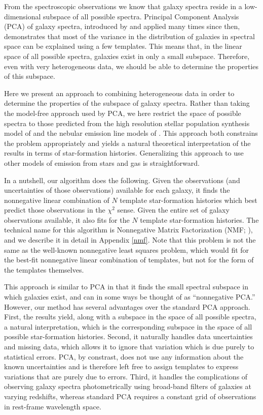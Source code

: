\documentclass[12pt,preprint]{aastex}
\begin{document}
From the spectroscopic observations we know that galaxy spectra reside
in a low-dimensional subspace of all possible spectra. Principal
Component Analysis (PCA) of galaxy spectra, introduced by
\citet{connolly95b} and applied many times since then, demonstrates
that most of the variance in the distribution of galaxies in spectral
space can be explained using a few templates. This means that, in the
linear space of all possible spectra, galaxies exist in only a small
subspace. Therefore, even with very heterogeneous data, we should be
able to determine the properties of this subspace.

Here we present an approach to combining heterogeneous data in order
to determine the properties of the subspace of galaxy spectra. Rather
than taking the model-free approach used by PCA, we here restrict the
space of possible spectra to those predicted from the high resolution
stellar population synthesis model of \citet{bruzual03a} and the
nebular emission line models of \citet{kewley01a}.  This approach both
constrains the problem appropriately and yields a natural theoretical
interpretation of the results in terms of star-formation
histories. Generalizing this approach to use other models of emission
from stars and gas is straightforward.

In a nutshell, our algorithm does the following. Given the
observations (and uncertainties of those observations) available for
each galaxy, it finds the nonnegative linear combination of $N$
template star-formation histories which best predict those
observations in the $\chi^2$ sense. Given the entire set of galaxy
observations available, it also fits for the $N$ template
star-formation histories. The technical name for this algorithm is
Nonnegative Matrix Factorization (NMF; \citealt{lee99a, lee00a}), and
we describe it in detail in Appendix \ref{nmf}. Note that this problem
is not the same as the well-known nonnegative least squares problem,
which would fit for the best-fit nonnegative linear combination of
templates, but not for the form of the templates themselves.

This approach is similar to PCA in that it finds the small spectral
subspace in which galaxies exist, and can in some ways be thought of
as ``nonnegative PCA.''  However, our method has several advantages
over the standard PCA approach. First, the results yield, along with a
subspace in the space of all possible spectra, a natural
interpretation, which is the corresponding subspace in the space of
all possible star-formation histories. Second, it naturally handles
data uncertainties and missing data, which allows it to ignore that
variation which is due purely to statistical errors. PCA, by
constrast, does not use any information about the known uncertainties
and is therefore left free to assign templates to express variations
that are purely due to errors. Third, it handles the complications of
observing galaxy spectra photometrically using broad-band filters of
galaxies at varying redshifts, whereas standard PCA requires a
constant grid of observations in rest-frame wavelength space.
\end{document}
